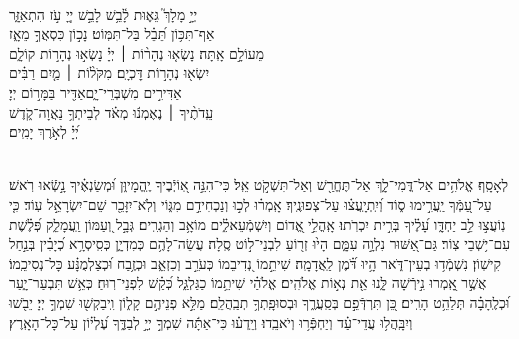 \documentclass[twoside, openany, parskip=half, 11pt]{book}
\begin{document}
\\
\vspace{-1.5\baselineskip}
\begin{narrow}
יְיָ֣ מָלָךְ֮ גֵּא֢וּת לָ֫בֵ֥שׁ\hfill
לָבֵ֣שׁ יְיָ֭ עֹ֣ז הִתְאַזָּ֑ר\\ אַף־תִּכּ֥וֹן תֵּ֝בֵ֗ל בַּל־תִּמּֽוֹט׃ \hfill
 נָכ֣וֹן כִּסְאֲךָ֣ מֵאָ֑ז\\ מֵעוֹלָ֣ם אָֽתָּה׃ \hfill
 נָשְׂא֤וּ נְהָר֨וֹת ׀ יְיָ֗ נָשְׂא֣וּ נְהָר֣וֹת קוֹלָ֑ם\\ יִשְׂא֖וּ נְהָר֣וֹת דׇּכְיָֽם׃ \hfill
 מִקֹּל֨וֹת ׀ מַ֤יִם רַבִּ֗ים\\ אַדִּירִ֣ים מִשְׁבְּרֵי־יָ֑ם\hfill אַדִּ֖יר בַּמָּר֣וֹם יְיָ׃ \\
 עֵֽדֹתֶ֨יךָ ׀ נֶאֶמְנ֬וּ מְאֹ֗ד \hfill לְבֵיתְךָ֥ נַאֲוָה־קֹ֑דֶשׁ\\ יְ֝יָ֗  לְאֹ֣רֶךְ יָמִֽים׃ \hfill \break
\end{narrow}



 
\label{kaddish_yasom_shacharis}


\mournerskaddish

 
\\ 
%
  לְאָסָֽף׃ אֱלֹהִ֥ים אַל־דֳּמִי־לָ֑ךְ אַל־תֶּחֱרַ֖שׁ וְאַל־תִּשְׁקֹ֣ט אֵֽל׃ כִּי־הִנֵּ֣ה אֽ֭וֹיְֿבֶיךָ יֶֽהֱמָיוּ֑ן וּ֝מְשַׂנְאֶ֗יךָ נָ֣שְֿׂאוּ רֹֽאשׁ׃ עַל־עַ֭מְּֿךָ יַֽעֲרִ֣ימוּ ס֑וֹד וְ֝יִֽתְיָֽעֲצ֗וּ עַל־צְפוּנֶֽיךָ׃
   אָֽמְר֗וּ לְכ֣וּ וְנַכְחִידֵ֣ם מִגּ֑וֹי וְלֹֽא־יִזָּכֵ֖ר שֵׁם־יִשְׂרָאֵ֣ל עֽוֹד׃ כִּ֤י נֽוֹעֲצ֣וּ לֵ֣ב יַחְדָּ֑ו עָ֝לֶ֗יךָ בְּרִ֣ית יִכְרֹֽתוּ׃ אָֽהֳלֵ֣י אֱ֭דוֹם וְיִשְׁמְֿעֵאלִ֑֗ים מוֹאָ֥ב וְהַגְרִֽים׃ גְּבָ֣ל וְ֭עַמּוֹן וַֽעֲמָלֵ֑ק פְּ֝לֶ֗שֶׁת עִם־י֥שְׁבֵי צֽוֹר׃ גַּם־אַ֭שּׁוּר נִלְוָ֣ה עִמָּ֑ם הָי֙וּ זְר֖וֹעַ לִבְנֵי־ל֣וֹט סֶֽלָה׃ עֲשֵׂה־לָהֶ֥ם כְּמִדְיָ֑ן כְּסִֽיסְרָ֥א כְ֝יָבִ֗ין בְּנַ֣חַל קִישֽׁוֹן׃ נִשְׁמְֿד֥וּ בְעֵין־דֹּ֑אר הָ֥יוּ דֹּ֝֗מֶן לַֽאֲדָמָֽה׃ שִׁיתֵ֣מוֹ נְ֭דִיבֵמוֹ כְּעֹרֵ֣ב וְכִזְאֵ֑ב וּכְזֶ֥בַח וּ֝כְצַלְמֻנָּ֗ע כָּל־נְסִיכֵֽמוֹ׃ אֲשֶׁ֣ר אָֽ֭מְרוּ נִ֣ירְֿשָׁה לָּ֑נוּ אֵ֖ת נְא֣וֹת אֱלֹהִֽים׃ אֱלֹהַ֗י שִׁיתֵ֥מוֹ כַגַּלְגַּ֑ל כְּ֝קַ֗שׁ לִפְנֵי־רֽוּחַ׃ כְּאֵ֥שׁ תִּבְעַר־יָ֑עַר וּ֝כְלֶֽהָבָ֗ה תְּלַהֵ֥ט הָרִֽים׃  כֵּ֭ן תִּרְדְּֿפֵ֣ם בְּסַֽעֲרֶ֑ךָ וּבְסוּפָֽתְךָ֥ תְבַֽהֲלֵֽם׃ מַלֵּ֣א פְנֵיהֶ֣ם קָל֑וֹן וִֽיבַקְשׁ֖וּ שִׁמְךָ֣ יְיָ׃ יֵבֹ֖שׁוּ וְיִבָּֽהֲל֥וּ עֲדֵי־עַ֗ד וְיַחְפְּֿר֥וּ וְיֹאבֵֽדוּ׃ וְיֵֽדְע֗וּ כִּי־אַתָּ֬ה שִׁמְךָ֣ יְיָ֣ לְבַדֶּ֑ךָ עֶ֝לְי֗וֹן עַל־כָּל־הָאָֽרֶץ׃

\nextpage
\end{document}
